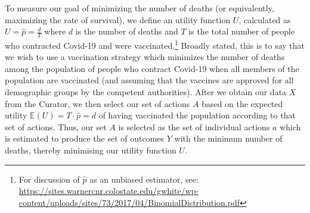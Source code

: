 \documentclass{article}
\begin{document}
To measure our goal of minimizing the number of deaths (or equivalently, maximizing the rate of survival), we define an utility function $U$, calculated as $U = \hat{p} = \frac{d}{T}$ where $d$ is the number of deaths and $T$ is the total number of people who contracted Covid-19 and were vaccinated.\footnote{For discussion of $\hat{p}$ as an unbiased estimator, see: \url{https://sites.warnercnr.colostate.edu/gwhite/wp-content/uploads/sites/73/2017/04/BinomialDistribution.pdf}} Broadly stated, this is to say that we wish to use a vaccination strategy which minimizes the number of deaths among the population of people who contract Covid-19 when all members of the population are vaccinated (and assuming that the vaccines are approved for all demographic groups by the competent authorities). After we obtain our data $X$ from the Curator, we then select our set of actions $A$ based on the expected utility $\mathbb{E}(U)=T \cdot \hat{p} = d$ of having vaccinated the population according to that set of actions. Thus, our set $A$ is selected as the set of individual actions $a$ which is estimated to produce the set of outcomes $Y$ with the minimum number of deaths, thereby minimising our utility function $U$.
\end{document}
